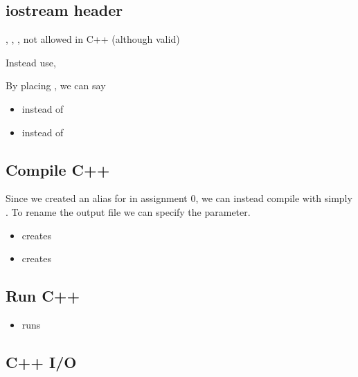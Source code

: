\subsection{iostream header}

, , , 
\textrightarrow{} not allowed in C++ (although valid)

Instead use, 

By placing , we can say
\begin{itemize}
    \item {} instead of 
    \item {} instead of 
\end{itemize}

\subsection{Compile C++}
Since we created an alias for  in assignment 0, we can instead
compile with simply . To rename the output file
we can specify the  parameter.
\begin{itemize}
    \item {} \textrightarrow{} creates 
    \item {} \textrightarrow{} creates 
\end{itemize}

\subsection{Run C++}
\begin{itemize}
    \item {} \textrightarrow{} runs 
\end{itemize}

\subsection{C++ I/O}

